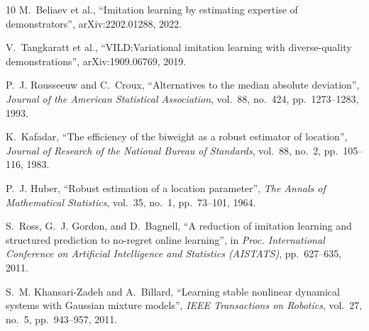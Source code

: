 \documentclass{beamer}
\begin{document}
\begin{frame}[allowframebreaks]
\begin{thebibliography}{10}
        M.~Beliaev et al.,
        ``Imitation learning by estimating expertise of demonstrators'',
        arXiv:2202.01288, 2022.

        V.~Tangkaratt et al.,
        ``VILD:\@ Variational imitation learning with diverse-quality demonstrations'',
        arXiv:1909.06769, 2019.

        P.~J. Rousseeuw and C.~Croux,
        ``Alternatives to the median absolute deviation'',
        \emph{Journal of the American Statistical Association},
        vol.~88, no.~424, pp.~1273--1283, 1993.

        K.~Kafadar,
        ``The efficiency of the biweight as a robust estimator of location'',
        \emph{Journal of Research of the National Bureau of Standards},
        vol.~88, no.~2, pp.~105--116, 1983.

        P.~J. Huber,
        ``Robust estimation of a location parameter'',
        \emph{The Annals of Mathematical Statistics},
        vol.~35, no.~1, pp.~73--101, 1964.

        S.~Ross, G.~J. Gordon, and D.~Bagnell,
        ``A reduction of imitation learning and structured prediction to no-regret online learning'',
        in \emph{Proc. International Conference on Artificial Intelligence and Statistics (AISTATS)},
        pp.~627--635, 2011.

        S.~M. Khansari-Zadeh and A.~Billard,
        ``Learning stable nonlinear dynamical systems with Gaussian mixture models'',
        \emph{IEEE Transactions on Robotics},
        vol.~27, no.~5, pp.~943--957, 2011.

    \end{thebibliography}

\end{frame}
\end{document}
